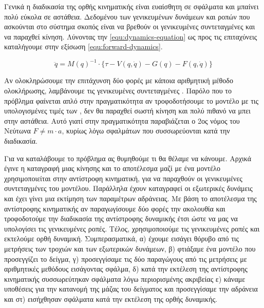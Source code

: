 Γενικά η διαδικασία της ορθής κινηματικής είναι ευαίσθητη σε σφάλματα και μπαίνει πολύ εύκολα σε αστάθεια. Δεδομένου των γενικευμένων δυνάμεων και ροπών που ασκούνται στο σύστημα σκοπός είναι να βρεθούν οι γενικευμένες συντεταγμένες  και να παραχθεί κίνηση. Λύνοντας την \ref{equ:dynamics-equation} ως προς τις επιταχύνεις καταλήγουμε στην εξίσωση \ref{equ:forward-dynamics}.

\begin{equation}
    \ddot{q} = M(q)^{-1} \cdot \{ \tau - V(q, \dot{q}) - G(q) - F(q, \dot{q})\}
    \label{equ:forward-dynamics}
\end{equation}

Αν ολοκληρώσουμε την επιτάχυνση δύο φορές με κάποια αριθμητική μέθοδο ολοκλήρωσης, λαμβάνουμε τις γενικευμένες συντεταγμένες . Παρόλο που το πρόβλημα φαίνεται απλό στην πραγματικότητα αν τροφοδοτήσουμε το μοντέλο με τις υπολογισμένες τιμές των , δεν θα παραχθεί σωστή κίνηση και πολύ πιθανό να μπει στην αστάθεια. Αυτό γιατί στην πραγματικότητα παραβιάζεται ο 2ος νόμος του Νεύτωνα $F \neq m \cdot a$, κυρίως λόγω σφαλμάτων που συσσωρεύονται κατά την διαδικασία.

Για να καταλάβουμε το πρόβλημα ας θυμηθούμε τι θα θέλαμε να κάνουμε. Αρχικά έγινε η καταγραφή μιας κίνησης και το αποτέλεσμα μαζί με ένα μοντέλο χρησιμοποιείται στην αντίστροφη κινηματική, για να παραχθούν οι γενικευμένες συντεταγμένες του μοντέλου. Παράλληλα έχουν καταγραφεί οι εξωτερικές δυνάμεις και έχει γίνει μια εκτίμηση των παραμέτρων αδράνειας. Με βάση το αποτέλεσμα της αντίστροφης κινηματικής αν παραγωγίσουμε δύο φορές την ακολουθία και τροφοδοτούμε την διαδικασία της αντίστροφης δυναμικής έτσι ώστε να μας να υπολογίσει τις γενικευμένες ροπές. Τέλος, χρησιμοποιούμε τις γενικευμένες ροπές και εκτελούμε ορθή δυναμική. Συμπερασματικά, α) έχουμε εισάγει θόρυβο από τις μετρήσεις των τροχιών και των εξωτερικών δυνάμεων, β) φτιάξαμε ένα μοντέλο που προσεγγίζει το δείγμα, γ) προσεγγίσαμε τις δύο παραγώγους από τις μετρήσεις με αριθμητικές μεθόδους εισάγοντας σφάλμα, δ) κατά την εκτέλεση της αντίστροφης κινηματικής συσσωρεύτηκαν σφάλματα λόγω περιορισμένης ακριβείας ε) κάναμε υποθέσεις για την κατανομή της μάζας του δείγματος και προσεγγίσαμε την αδράνεια και στ) εισήχθησαν σφάλματα κατά την εκτέλεση της ορθής δυναμικής.
